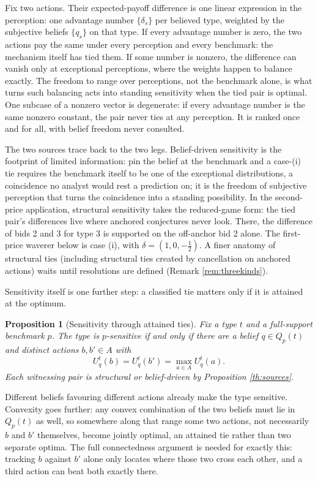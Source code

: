\documentclass[12pt]{article}
\newtheorem{proposition}{Proposition}
\theoremstyle{definition}
\begin{document}
Fix two actions. Their expected-payoff difference is one linear expression in the perception: one advantage number $\{\delta_s\}$ per believed type, weighted by the subjective beliefs $\{q_s\}$ on that type. If every advantage number is zero, the two actions pay the same under every perception and every benchmark: the mechanism itself has tied them. If some number is nonzero, the difference can vanish only at exceptional perceptions, where the weights happen to balance exactly. The freedom to range over perceptions, not the benchmark alone, is what turns such balancing acts into standing sensitivity when the tied pair is optimal. One subcase of a nonzero vector is degenerate: if every advantage number is the same nonzero constant, the pair never ties at any perception. It is ranked once and for all, with belief freedom never consulted.

The two sources trace back to the two legs. Belief-driven sensitivity is the footprint of limited information: pin the belief at the benchmark and a case-(i) tie requires the benchmark itself to be one of the exceptional distributions, a coincidence no analyst would rest a prediction on; it is the freedom of subjective perception that turns the coincidence into a standing possibility. In the second-price application, structural sensitivity takes the reduced-game form: the tied pair's differences live where anchored conjectures never look. There, the difference of bids 2 and 3 for type 3 is supported on the off-anchor bid 2 alone. The first-price waverer below is case (i), with $\delta = (1, 0, -\tfrac12)$. A finer anatomy of structural ties (including structural ties created by cancellation on anchored actions) waits until resolutions are defined (Remark \ref{rem:threekinds}).

Sensitivity itself is one further step: a classified tie matters only if it is attained at the optimum.

\begin{proposition}[Sensitivity through attained ties]\label{prop:attainedtie}
Fix a type $t$ and a full-support benchmark $p$. The type is $p$-sensitive if and only if there are a belief $q \in Q_p(t)$ and distinct actions $b, b' \in A$ with
\[
U^t_q(b) = U^t_q(b') = \max_{a \in A} U^t_q(a).
\]
Each witnessing pair is structural or belief-driven by Proposition \ref{th:sources}.
\end{proposition}

Different beliefs favouring different actions already make the type sensitive. Convexity goes further: any convex combination of the two beliefs must lie in $Q_p(t)$ as well, so somewhere along that range some two actions, not necessarily $b$ and $b'$ themselves, become jointly optimal, an attained tie rather than two separate optima. The full connectedness argument is needed for exactly this: tracking $b$ against $b'$ alone only locates where those two cross each other, and a third action can beat both exactly there.
\end{document}
